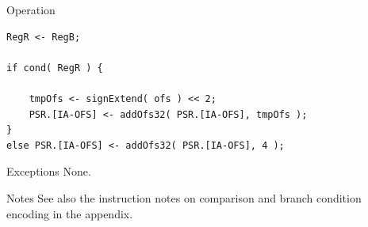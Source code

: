 \begin{iPageDescOpEntry}{Operation}
\begin{lstlisting}[style=iPageOpStyle]
RegR <- RegB;

if cond( RegR ) {

    tmpOfs <- signExtend( ofs ) << 2;
    PSR.[IA-OFS] <- addOfs32( PSR.[IA-OFS], tmpOfs );
}
else PSR.[IA-OFS] <- addOfs32( PSR.[IA-OFS], 4 );
\end{lstlisting}
\end{iPageDescOpEntry}

\begin{iPageDescEntry}{Exceptions}
None.
\end{iPageDescEntry}

\begin{iPageDescEntry}{Notes}
See also the instruction notes on comparison and branch condition encoding in the appendix.
\end{iPageDescEntry}


